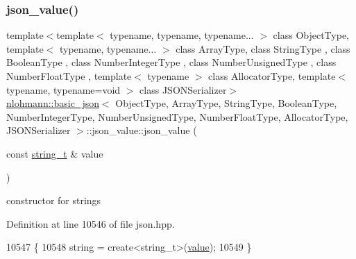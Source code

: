 \subsubsection{\texorpdfstring{json\+\_\+value()}{json\_value()}\hspace{0.1cm}{\footnotesize\ttfamily [7/12]}}
{\footnotesize\ttfamily template$<$template$<$ typename, typename, typename... $>$ class Object\+Type, template$<$ typename, typename... $>$ class Array\+Type, class String\+Type , class Boolean\+Type , class Number\+Integer\+Type , class Number\+Unsigned\+Type , class Number\+Float\+Type , template$<$ typename $>$ class Allocator\+Type, template$<$ typename, typename=void $>$ class J\+S\+O\+N\+Serializer$>$ \\
\hyperlink{classnlohmann_1_1basic__json}{nlohmann\+::basic\+\_\+json}$<$ Object\+Type, Array\+Type, String\+Type, Boolean\+Type, Number\+Integer\+Type, Number\+Unsigned\+Type, Number\+Float\+Type, Allocator\+Type, J\+S\+O\+N\+Serializer $>$\+::json\+\_\+value\+::json\+\_\+value (\begin{DoxyParamCaption}\item[{const \hyperlink{classnlohmann_1_1basic__json_a61f8566a1a85a424c7266fb531dca005}{string\+\_\+t} \&}]{value }\end{DoxyParamCaption})\hspace{0.3cm}{\ttfamily [inline]}}



constructor for strings 



Definition at line 10546 of file json.\+hpp.


\begin{DoxyCode}
10547         \{
10548             \textcolor{keywordtype}{string} = create<string\_t>(\hyperlink{classnlohmann_1_1basic__json_adcf8ca5079f5db993820bf50036bf45d}{value});
10549         \}
\end{DoxyCode}
\mbox{\label{unionnlohmann_1_1basic__json_1_1json__value_ab9c8696a9477ec8a9bce79dec04ef418}} 
